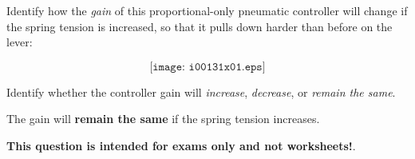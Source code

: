 

Identify how the {\it gain} of this proportional-only pneumatic controller will change if the spring tension is increased, so that it pulls down harder than before on the lever:

$$\texttt{[image: i00131x01.eps]}$$

Identify whether the controller gain will {\it increase}, {\it decrease}, or {\it remain the same}.

\vskip 30pt







The gain will {\bf remain the same} if the spring tension increases.







{\bf This question is intended for exams only and not worksheets!}.



